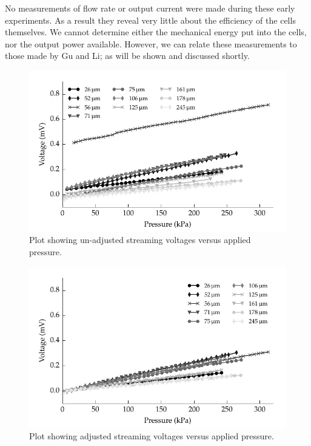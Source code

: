       No measurements of flow rate or output current were made during these early experiments.
      As a result they reveal very little about the efficiency of the cells themselves.
      We cannot determine either the mechanical energy put into the cells, nor the output power available.
      However, we can relate these measurements to those made by Gu and Li; as will be shown and discussed shortly.

      \begin{figure}
          \centering
          \includegraphics{content/pt1/01-PowerHarvesting/graphics/graph_streamingVoltageGradient_vs_height_noCorrection}
          \caption{\label{fig:streamingCell_all_unadjusted}Plot showing un-adjusted streaming voltages versus applied pressure.}
      \end{figure}

      \begin{figure}
          \centering
          \includegraphics{content/pt1/01-PowerHarvesting/graphics/graph_streamingVoltageGradient_vs_height}
          \caption{\label{fig:streamingCell_all_adjusted}Plot showing adjusted streaming voltages versus applied pressure.}
      \end{figure}


